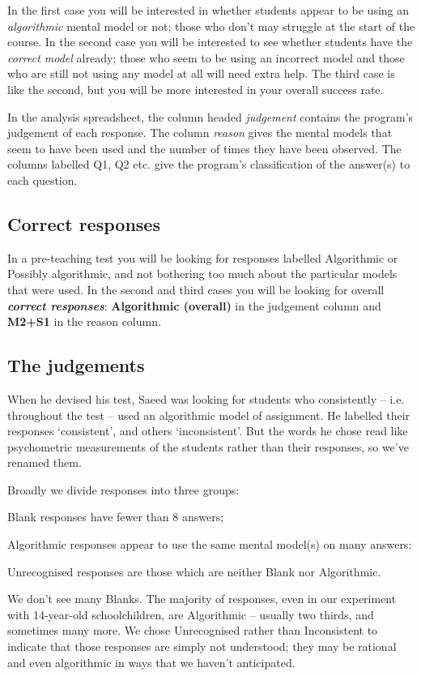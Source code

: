 \documentclass[11pt,a4paper]{article}
\begin{document}
In the first case you will be interested in whether students appear to be using an \emph{algorithmic} mental model or not; those who don't may struggle at the start of the course. In the second case you will be interested to see whether students have the \emph{correct model} already; those who seem to be using an incorrect model and those who are still not using any model at all will need extra help. The third case is like the second, but you will be more interested in your overall success rate.

In the analysis spreadsheet, the column headed \emph{judgement} contains the program's judgement of each response. The column \emph{reason} gives the mental models that seem to have been used and the number of times they have been observed. The columns labelled Q1, Q2 etc. give the program's classification of the answer(s) to each question.

\subsection{Correct responses}

In a pre-teaching test you will be looking for responses labelled Algorithmic or Possibly algorithmic, and not bothering too much about the particular models that were used. In the second and third cases you will be looking for overall \textbf{\textit{correct responses}}: \textbf{Algorithmic (overall)} in the judgement column and \textbf{M2+S1} in the reason column.

\subsection{The judgements}

When he devised his test, Saeed was looking for students who consistently -- i.e. throughout the test -- used an algorithmic model of assignment. He labelled their responses `consistent', and others `inconsistent'. But the words he chose read like psychometric measurements of the students rather than their responses, so we've renamed them.

Broadly we divide responses into three groups:
\begin{description*}
\item[Blank responses] have fewer than 8 answers;  
\item[Algorithmic responses] appear to use the same mental model(s) on many answers;
\item[Unrecognised responses] are those which are neither Blank nor Algorithmic.
\end{description*}
We don't see many Blanks. The majority of responses, even in our experiment with 14-year-old schoolchildren, are Algorithmic -- usually two thirds, and sometimes many more. We chose Unrecognised rather than Inconsistent to indicate that those responses are simply not understood; they may be rational and even algorithmic in ways that we haven't anticipated.
\end{document}
